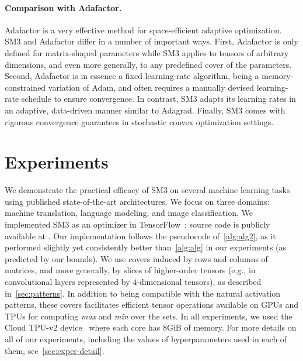 \documentclass[a4paper,11pt]{article}
\def\NAME{SM3\xspace}
\begin{document}
\paragraph{Comparison with Adafactor.}
Adafactor \cite{shazeer18} is a very effective method for space-efficient
adaptive optimization. \NAME and Adafactor differ in a number of important ways.
First, Adafactor is only defined for matrix-shaped parameters while \NAME
applies to tensors of arbitrary dimensions, and even more generally, to any
predefined cover of the parameters. Second, Adafactor is in essence a fixed
learning-rate algorithm, being a memory-constrained variation of Adam, and often
requires a manually devised learning-rate schedule to ensure convergence. In
contrast, \NAME adapts its learning rates in an adaptive, data-driven manner
similar to Adagrad. Finally, \NAME comes with rigorous convergence guarantees in
stochastic convex optimization settings.


\section{Experiments}
\label{sec:exper}

\def\4x4{4\!\times\!4}
\def\8x8{8\!\times\!8}
\def\16x16{16\!\times\!16}

We demonstrate the practical efficacy of \NAME on several machine learning tasks
using published state-of-the-art architectures. We focus on three domains:
machine translation, language modeling, and image classification.
We implemented \NAME as an optimizer in TensorFlow~\cite{tensorflow}; source code is publicly available at \cite{sm3git2019}. Our
implementation follows the pseudocode of~\cref{alg:alg2}, as it performed
slightly yet consistently better than~\cref{alg:alg} in our experiments (as
predicted by our bounds).
We use covers induced by rows and columns of matrices, and more generally, by
slices of higher-order tensors (e.g., in convolutional layers represented by
$4$-dimensional tensors), as described in~\cref{sec:patterns}. In addition to
being compatible with the natural activation patterns, these covers facilitates
efficient tensor operations available on GPUs and TPUs for computing \emph{max}
and \emph{min} over the sets. In all experiments, we used the Cloud TPU-v2
device~\citep{jouppi2017datacenter} where each core has 8GiB of memory. For more
details on all of our experiments, including the values of hyperparameters used
in each of them, see~\cref{sec:exper-detail}.
\end{document}
